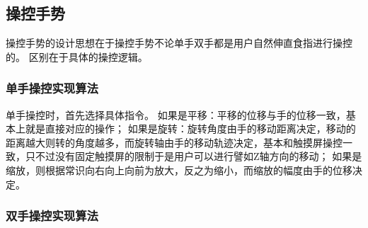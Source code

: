 

\subsection{操控手势}

操控手势的设计思想在于操控手势不论单手双手都是用户自然伸直食指进行操控的。
区别在于具体的操控逻辑。
\subsubsection{单手操控实现算法}

单手操控时，首先选择具体指令。
如果是平移：平移的位移与手的位移一致，基本上就是直接对应的操作；
如果是旋转：旋转角度由手的移动距离决定，移动的距离越大则转的角度越多，而旋转轴由手的移动轨迹决定，基本和触摸屏操控一致，只不过没有固定触摸屏的限制于是用户可以进行譬如Z轴方向的移动；
如果是缩放，则根据常识向右向上向前为放大，反之为缩小，而缩放的幅度由手的位移决定。
\subsubsection{双手操控实现算法}

